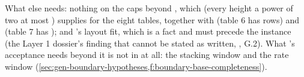 What else  needs: nothing on the caps beyond
, which  (every height a power of two at
most ) supplies for the eight tables, together with  (table 6 has
 rows) and  (table 7 has
); and 's layout fit, which is a  fact
and must precede the instance (the Layer 1 dossier's finding that 
cannot be stated as written, , G.2). What 's acceptance needs
beyond it is not in  at all: the stacking window  and the
rate window (\cref{sec:gen-boundary-hypotheses,f:boundary-base-completeness}).
